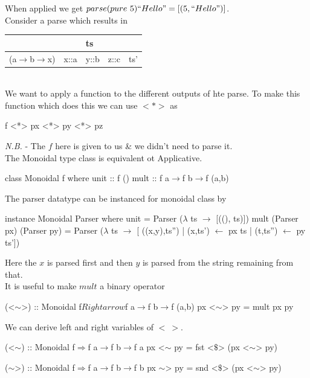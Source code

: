 \documentclass[11pt,a4paper]{article}
\begin{document}
When applied we get $parse (pure\ 5) ``Hello" = [(5,``Hello")]$.\\

Consider a parse which results in\\
\begin{tabular}{|lllll|}
\hline
&&ts&&\\
\hline
(a$\to$b$\to$x)\vline&x::a\vline&y::b\vline&z::c\vline&ts'\\
\hline
\end{tabular}\\
We want to apply a function to the different outputs of hte parse. To make this function which does this we can use $<*>$ as
\begin{code}
f <*> px <*> py <*> pz
\end{code}
\textit{N.B.} - The $f$ here is given to us \& we didn't need to parse it.\\

The Monoidal type class is equivalent ot Applicative.
\begin{code}
class Monoidal f
  where
    unit :: f ()
    mult :: f a$\to$f b$\to$f (a,b)
\end{code}

The parser datatype can be instanced for monoidal class by
\begin{code}
instance Monoidal Parser
  where
    unit                         = Parser ($\lambda$ ts $\to$ [((), ts)])
    mult (Parser px) (Parser py) = Parser ($\lambda$ ts $\to$ [ ((x,y),ts'')
                                          | (x,ts')  $\leftarrow$ px ts
                                          | (t,ts'') $\leftarrow$ py ts'])
\end{code}
Here the $x$ is parsed first and then $y$ is parsed from the string remaining from that.\\

It is useful to make $mult$ a binary operator
\begin{code}
(<$\sim$>) :: Monoidal f$Rightarrow$f a$\to$f b$\to$f (a,b)
px <$\sim$> py = mult px py
\end{code}

We can derive left and right variables of $<~>$.
\begin{code}
(<$\sim$) :: Monoidal f$\Rightarrow$f a$\to$f b$\to$f a
px <$\sim$ py = fst <$\mathdollar$> (px <$\sim$> py)

($\sim$>) :: Monoidal f$\Rightarrow$f a$\to$f b$\to$f b
px $\sim$> py = snd <$\mathdollar$> (px <$\sim$> py)
\end{code}
\end{document}
